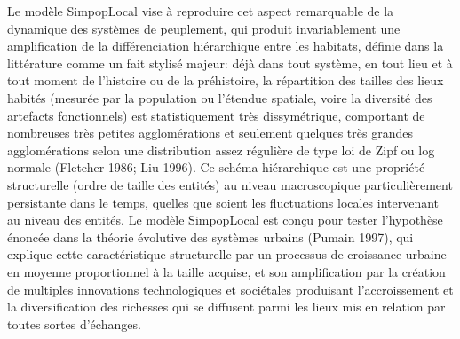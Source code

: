 \documentclass[10pt]{article}
\begin{document}
Le modèle SimpopLocal vise à reproduire cet aspect remarquable de la dynamique des systèmes de peuplement, qui produit invariablement une amplification de la différenciation hiérarchique entre les habitats, définie dans la littérature comme un fait stylisé majeur: déjà dans tout système, en tout lieu et à tout moment de l’histoire ou de la préhistoire, la répartition des tailles des lieux habités (mesurée par la population ou l’étendue spatiale, voire la diversité des artefacts fonctionnels) est statistiquement très dissymétrique, comportant de nombreuses très petites agglomérations et seulement quelques très grandes agglomérations selon une distribution assez régulière de type loi de Zipf ou log normale (Fletcher 1986; Liu 1996). Ce schéma hiérarchique est une propriété structurelle (ordre de taille des entités) au niveau macroscopique particulièrement persistante dans le temps, quelles que soient les fluctuations locales intervenant au niveau des entités. Le modèle SimpopLocal est conçu pour tester l'hypothèse énoncée dans la théorie évolutive des systèmes urbains (Pumain 1997), qui explique cette caractéristique structurelle par un processus de croissance urbaine en moyenne proportionnel à la taille acquise, et son amplification par la création de multiples innovations technologiques et sociétales produisant l’accroissement et la diversification des richesses qui se diffusent parmi les lieux mis en relation par toutes sortes d’échanges.
\end{document}
